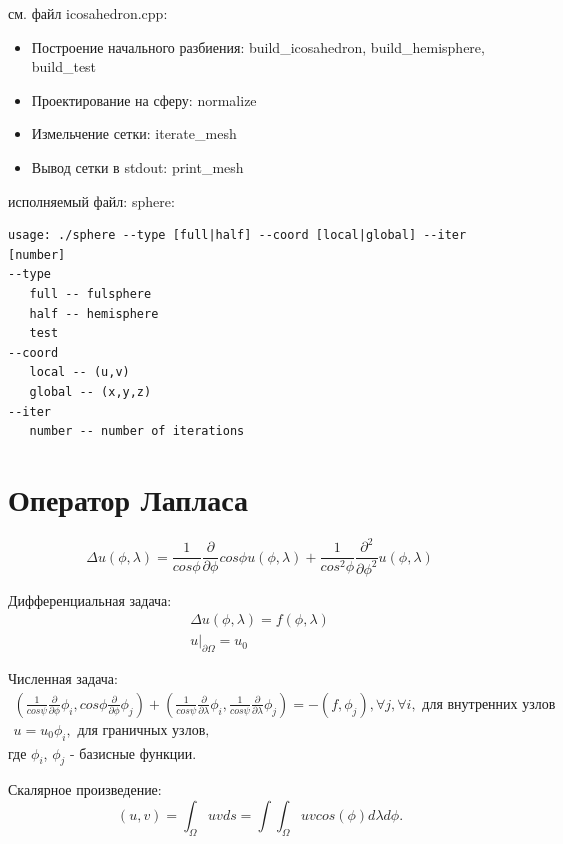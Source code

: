 \documentclass[a4paper,article]{article}
\begin{document}
см. файл icosahedron.cpp:
\begin{itemize}
\item Построение начального разбиения: build\_icosahedron, build\_hemisphere, build\_test
\item Проектирование на сферу: normalize
\item Измельчение сетки: iterate\_mesh
\item Вывод сетки в stdout: print\_mesh
\end{itemize}
исполняемый файл: sphere:
\begin{verbatim}
usage: ./sphere --type [full|half] --coord [local|global] --iter [number]
--type
   full -- fulsphere
   half -- hemisphere
   test
--coord
   local -- (u,v)
   global -- (x,y,z)
--iter
   number -- number of iterations
\end{verbatim}

\section{Оператор Лапласа}
\begin{equation*}
\Delta u(\phi, \lambda) = \frac{1}{cos \phi}\frac{\partial}{\partial \phi} cos \phi u(\phi, \lambda)+\frac{1}{cos^2 \phi}\frac{\partial^2}{\partial\phi^2}u(\phi, \lambda)
\end{equation*}

Дифференциальная задача:
\begin{equation*}
\begin{split}
\Delta u(\phi, \lambda) = f(\phi, \lambda)\\
u|_{\partial\Omega} = u_0
\end{split}
\end{equation*}

Численная задача:
\begin{equation*}
\begin{split}
(\frac{1}{cos\psi}\frac{\partial}{\partial \phi} \phi_i, cos\phi \frac{\partial}{\partial \phi} \phi_j)
+(\frac{1}{cos\psi}\frac{\partial}{\partial \lambda}\phi_i, \frac{1}{cos\psi}\frac{\partial}{\partial \lambda}\phi_j ) = -(f, \phi_j), \forall j, \forall i, \text{ для внутренних узлов } \\
u = u_0 \phi_i, \text { для граничных узлов, }
\end{split}
\end{equation*}
где $\phi_i$, $\phi_j$ - базисные функции.

Скалярное произведение:
\begin{equation*}
(u, v) = \int_\Omega u v ds = \int\int_\Omega u v cos(\phi)d\lambda d\phi.
\end{equation*}
\end{document}
